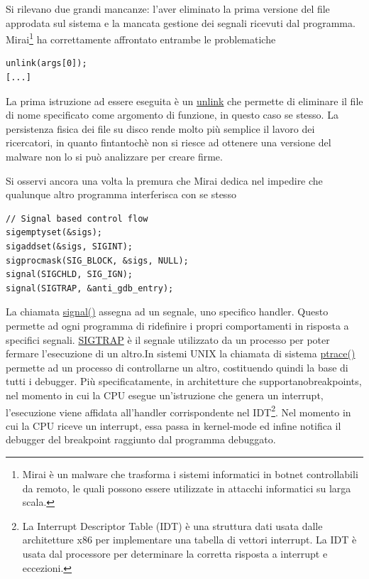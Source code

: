 \documentclass[12pt,oneside]{fithesis2}
\begin{document}
            Si rilevano due grandi mancanze: l'aver eliminato la prima versione del file approdata sul sistema e la mancata gestione dei segnali ricevuti dal programma. Mirai\footnote{Mirai è un malware che trasforma i sistemi informatici in botnet controllabili da remoto, le quali possono essere utilizzate in attacchi informatici su larga scala.} ha correttamente affrontato entrambe le problematiche
            \begin{verbatim}
unlink(args[0]);
[...]          
            \end{verbatim}            
            La prima istruzione ad essere eseguita è un \url{unlink} che permette di eliminare il file di nome specificato come argomento di funzione, in questo caso se stesso. La persistenza fisica dei file su disco rende molto più semplice il lavoro dei ricercatori, in quanto fintantochè non si riesce ad ottenere una versione del malware non lo si può analizzare per creare firme.
        
            Si osservi ancora una volta la premura che Mirai dedica nel impedire che qualunque altro programma interferisca con se stesso
            \begin{verbatim}
// Signal based control flow
sigemptyset(&sigs);
sigaddset(&sigs, SIGINT);
sigprocmask(SIG_BLOCK, &sigs, NULL);
signal(SIGCHLD, SIG_IGN);
signal(SIGTRAP, &anti_gdb_entry);                     
            \end{verbatim}
            La chiamata \url{signal()} assegna ad un segnale, uno specifico handler. Questo permette ad ogni programma di ridefinire i propri comportamenti in risposta a specifici segnali. \url{SIGTRAP} è il segnale utilizzato da un processo per poter fermare l'esecuzione di un altro.\newline In sistemi UNIX la chiamata di sistema \url{ptrace()} permette ad un processo di controllarne un altro, costituendo quindi la base di tutti i debugger.  Più specificatamente, in architetture che supportano\newline breakpoints, nel momento in cui la CPU esegue un'istruzione che genera un interrupt, l'esecuzione viene affidata all'handler corrispondente nel IDT\footnote{La Interrupt Descriptor Table (IDT) è una struttura dati usata dalle architetture x86 per implementare una tabella di vettori interrupt. La IDT è usata dal processore per determinare la corretta risposta a interrupt e eccezioni.}.
            Nel momento in cui la CPU riceve un interrupt, essa passa in kernel-mode ed infine notifica il debugger del breakpoint raggiunto dal programma debuggato.            
        \clearpage
\end{document}

